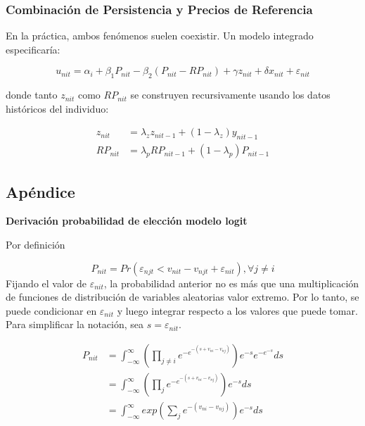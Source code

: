 \documentclass[
]{book}
\begin{document}
\subsubsection{Combinación de Persistencia y Precios de Referencia}\label{combinaciuxf3n-de-persistencia-y-precios-de-referencia}

En la práctica, ambos fenómenos suelen coexistir. Un modelo integrado especificaría:

\begin{equation}
u_{nit} = \alpha_i + \beta_1 P_{nit} - \beta_2(P_{nit} - RP_{nit}) + \gamma z_{nit} + \delta x_{nit} + \varepsilon_{nit}
\label{eq:utilfull}
\end{equation}

donde tanto \(z_{nit}\) como \(RP_{nit}\) se construyen recursivamente usando los datos históricos del individuo:

\[
\begin{aligned}
z_{nit} &= \lambda_z z_{nit-1} + (1-\lambda_z) y_{nit-1}\\
RP_{nit} &= \lambda_p RP_{nit-1} + (1-\lambda_p) P_{nit-1}
\end{aligned}
\]

\subsection*{Apéndice}\label{apuxe9ndice}

\textbf{Derivación probabilidad de elección modelo logit}

Por definición

\[P_{nit} = Pr(\varepsilon_{njt}<v_{nit} - v_{njt} + \varepsilon_{nit}), \forall j \neq i\]
Fijando el valor de \(\varepsilon_{nit}\), la probabilidad anterior no es más que una multiplicación de funciones de distribución de variables aleatorias valor extremo. Por lo tanto, se puede condicionar en \(\varepsilon_{nit}\) y luego integrar respecto a los valores que puede tomar. Para simplificar la notación, sea \(s=\varepsilon_{nit}\).

\[
\begin{aligned}
P_{nit} &= \int_{-\infty}^{\infty} \left(\prod_{j\neq i}    e^{-e^{-(s + v_{ni} - v_{nj})}}\right) e^{-s} e^{-e^{-s}}ds\\
&= \int_{-\infty}^{\infty} \left(\prod_{j}   e^{-e^{-(s + v_{ni} - v_{nj})}}\right) e^{-s}ds\\
&= \int_{-\infty}^{\infty} exp\left(\sum_{j}  e^{-(v_{ni} - v_{nj})}\right) e^{-s}ds
\end{aligned}
\]
\end{document}
